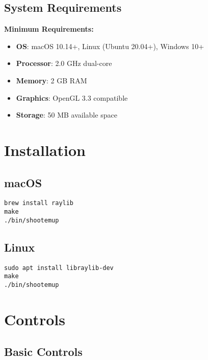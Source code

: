 \documentclass[11pt,a4paper]{article}
\begin{document}
\subsection{System Requirements}

\textbf{Minimum Requirements:}
\begin{itemize}
    \item \textbf{OS}: macOS 10.14+, Linux (Ubuntu 20.04+), Windows 10+
    \item \textbf{Processor}: 2.0 GHz dual-core
    \item \textbf{Memory}: 2 GB RAM
    \item \textbf{Graphics}: OpenGL 3.3 compatible
    \item \textbf{Storage}: 50 MB available space
\end{itemize}

\section{Installation}

\subsection{macOS}
\begin{verbatim}
brew install raylib
make
./bin/shootemup
\end{verbatim}

\subsection{Linux}
\begin{verbatim}
sudo apt install libraylib-dev
make
./bin/shootemup
\end{verbatim}

\section{Controls}

\subsection{Basic Controls}
\end{document}
